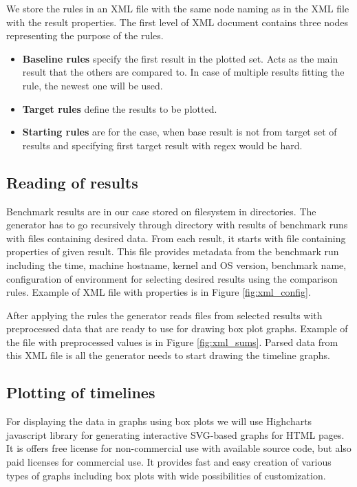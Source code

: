 We store the rules in an XML file with the same node naming as in the XML file
with the result properties. The first level of XML document contains three nodes
representing the purpose of the rules.
\begin{itemize}
  \item \textbf{Baseline rules} specify the first result in the plotted set.
    Acts as the main result that the others are compared to. In case of multiple
    results fitting the rule, the newest one will be used.
  \item \textbf{Target rules} define the results to be plotted.
  \item \textbf{Starting rules} are for the case, when base result is not from
    target set of results and specifying first target result with regex would be
    hard.
  \end{itemize}

\subsection{Reading of results}
Benchmark results are in our case stored on filesystem in directories. The
generator has to go recursively through directory with results of benchmark runs
with files containing desired data. From each result, it starts with file
containing properties of given result. This file provides metadata from the
benchmark run including the time, machine hostname, kernel and OS version,
benchmark name, configuration of environment for selecting desired results using
the comparison rules. Example of XML file with properties is in Figure
\ref{fig:xml_config}.

After applying the rules the generator reads files from
selected results with preprocessed data that are ready to use for drawing box
plot graphs. Example of the file with preprocessed values is in Figure
\ref{fig:xml_sums}. Parsed data from this XML file is all the generator needs to
start drawing the timeline graphs.

\subsection{Plotting of timelines}
For displaying the data in graphs using box plots we will use Highcharts
javascript library\;\cite{highcharts} for generating interactive SVG-based
graphs for HTML pages. It is offers free license for non-commercial use with
available source code, but also paid licenses for commercial use. It provides
fast and easy creation of various types of graphs including box plots with wide
possibilities of customization.

